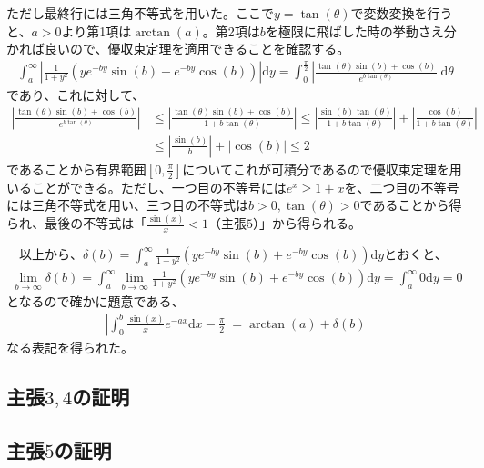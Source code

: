 \documentclass{article}
\begin{document}
ただし最終行には三角不等式を用いた。ここで$y = \tan(\theta)$で変数変換を行うと、$a > 0$より第1項は$\arctan(a)$。第2項は$b$を極限に飛ばした時の挙動さえ分かれば良いので、優収束定理を適用できることを確認する。
\begin{align*}
	 \int_a^{\infty} \left|  \frac{1}{1 + y^2} \left( ye^{-by} \sin(b) + e^{-by} \cos(b)\right) \right| \mathrm{d}y = \int_0^{\frac{\pi}{2}} \left|  \frac{\tan(\theta) \sin(b) + \cos(b)}{e^{b\tan(\theta)}} \right| \mathrm{d}\theta
\end{align*}
であり、これに対して、
\begin{align*}
	\left|  \frac{\tan(\theta) \sin(b) + \cos(b)}{e^{b\tan(\theta)}} \right| &\leq \left| \frac{\tan(\theta) \sin(b) + \cos(b)}{1 + b\tan(\theta)} \right| \leq \left| \frac{\sin(b)\tan(\theta)}{1 + b\tan(\theta)}\right| +  \left|\frac{\cos(b)}{1 + b\tan(\theta)} \right| \\[8pt]
	&\leq \left| \frac{\sin(b)}{b} \right| + \left| \cos(b) \right| \leq 2
\end{align*}
であることから有界範囲$[0, \frac{\pi}{2}]$についてこれが可積分であるので優収束定理を用いることができる。ただし、一つ目の不等号には$e^x \geq 1 + x$を、二つ目の不等号には三角不等式を用い、三つ目の不等式は$b > 0, \tan(\theta) > 0$であることから得られ、最後の不等式は「$\frac{\sin(x)}{x} < 1$（主張$5$）」から得られる。

　以上から、$\delta(b) = \int_a^{\infty}  \frac{1}{1 + y^2} \left( ye^{-by} \sin(b) + e^{-by} \cos(b)\right) \mathrm{d}y $とおくと、
\begin{align*}
	\lim_{b \to \infty} \delta(b) = \int_a^{\infty} \lim_{b \to \infty} \frac{1}{1 + y^2} \left( ye^{-by} \sin(b) + e^{-by} \cos(b)\right) \mathrm{d}y = \int_a^{\infty} 0 \mathrm{d}y = 0
\end{align*}
となるので確かに題意である、
\begin{align*}
	\left| \int_0^b \frac{\sin(x)}{x} e^{-ax} \mathrm{d}x - \frac{\pi}{2} \right| = \arctan(a) + \delta (b)
\end{align*}
なる表記を得られた。

\subsection{主張$3,4$の証明}

\subsection{主張$5$の証明}
\end{document}
